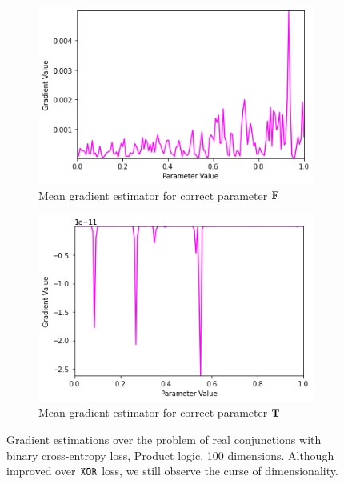 \begin{figure}[ht]
\begin{subfigure}[b]{0.47\textwidth}
        \includegraphics[width=\textwidth]{imgs/grad_prod_bce_falseparam_100dim_avg.png}
        \caption{Mean gradient estimator for correct parameter $\textbf{F}$}
        \label{fig:conjgrad100falseavgbce}
    \end{subfigure}
    \begin{subfigure}[b]{0.47\textwidth}
        \centering
        \includegraphics[width=\textwidth]{imgs/grad_prod_bce_trueparam_100dim_avg.png}
        \caption{Mean gradient estimator for correct parameter $\textbf{T}$}
        \label{fig:conjgrad100trueavgbce}
    \end{subfigure}
       \caption{Gradient estimations over the problem of real conjunctions with binary cross-entropy loss, Product logic, 100 dimensions. Although improved over $\texttt{XOR}$ loss, we still observe the curse of dimensionality.}
       \label{fig:conjgrad100bce}
\end{figure}


